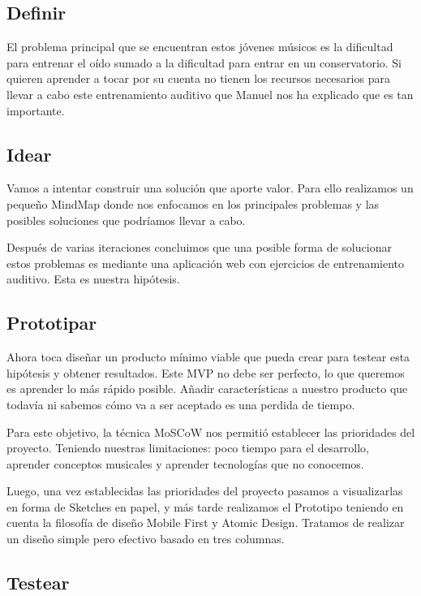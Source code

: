 \documentclass[12pt,twoside,titlepage]{report}
\begin{document}
{\subsection{Definir}

El problema principal que se encuentran estos jóvenes músicos es la dificultad para entrenar el oído sumado a la dificultad para entrar en un conservatorio. Si quieren aprender a tocar por su cuenta no tienen los recursos necesarios para llevar a cabo este entrenamiento auditivo que Manuel nos ha explicado que es tan importante.

\subsection{Idear}

Vamos a intentar construir una solución que aporte valor. Para ello realizamos un pequeño MindMap donde nos enfocamos en los principales problemas y las posibles soluciones que podríamos llevar a cabo.

Después de varias iteraciones concluimos que una posible forma de solucionar estos problemas es mediante una aplicación web con ejercicios de entrenamiento auditivo. Esta es nuestra hipótesis.

\subsection{Prototipar}

Ahora toca diseñar un producto mínimo viable que pueda crear para testear esta hipótesis y obtener resultados. Este MVP no debe ser perfecto, lo que queremos es aprender lo más rápido posible. Añadir características a nuestro producto que todavía ni sabemos cómo va a ser aceptado es una perdida de tiempo. 

Para este objetivo, la técnica MoSCoW nos permitió establecer las prioridades del proyecto. Teniendo nuestras limitaciones: poco tiempo para el desarrollo, aprender conceptos musicales y aprender tecnologías que no conocemos.

Luego, una vez establecidas las prioridades del proyecto pasamos a visualizarlas en forma de Sketches en papel, y más tarde realizamos el Prototipo teniendo en cuenta la filosofía de diseño Mobile First y Atomic Design. Tratamos de realizar un diseño simple pero efectivo basado en tres columnas.

\subsection{Testear}

}
\end{document}
